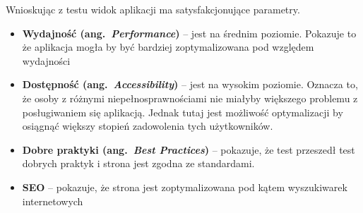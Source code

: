Wnioskując z testu widok aplikacji ma satysfakcjonujące parametry.
\begin{itemize}
\item \textbf{Wydajność (ang.~\emph{Performance})} -- jest na średnim poziomie. Pokazuje to że aplikacja mogła by być bardziej zoptymalizowana pod względem wydajności
\item \textbf{Dostępność (ang.~\emph{Accessibility})} -- jest na wysokim poziomie. Oznacza to, że osoby z różnymi niepełnosprawnościami nie miałyby większego problemu z posługiwaniem się aplikacją. Jednak tutaj jest możliwość optymalizacji by osiągnąć większy stopień zadowolenia tych użytkowników.
\item \textbf{Dobre praktyki (ang.~\emph{Best Practices})} -- pokazuje, że test przeszedł test dobrych praktyk i strona jest zgodna ze standardami.
\item \textbf{SEO} -- pokazuje, że strona jest zoptymalizowana pod kątem wyszukiwarek internetowych
\end{itemize}

